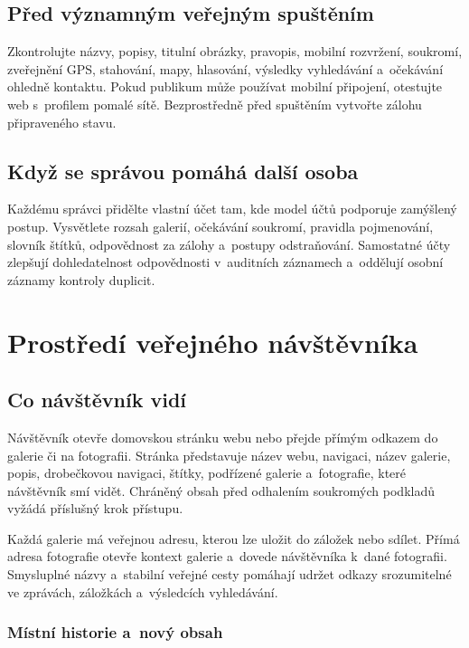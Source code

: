 \documentclass[11pt,a4paper]{article}
\begin{document}
\subsection{Před významným veřejným spuštěním}

Zkontrolujte názvy, popisy, titulní obrázky, pravopis, mobilní rozvržení,
soukromí, zveřejnění GPS, stahování, mapy, hlasování, výsledky vyhledávání
a~očekávání ohledně kontaktu. Pokud publikum může používat mobilní připojení,
otestujte web s~profilem pomalé sítě. Bezprostředně před spuštěním vytvořte
zálohu připraveného stavu.

\subsection{Když se správou pomáhá další osoba}

Každému správci přidělte vlastní účet tam, kde model účtů podporuje zamýšlený
postup. Vysvětlete rozsah galerií, očekávání soukromí, pravidla pojmenování,
slovník štítků, odpovědnost za zálohy a~postupy odstraňování. Samostatné účty
zlepšují dohledatelnost odpovědnosti v~auditních záznamech a~oddělují osobní
záznamy kontroly duplicit.

\section{Prostředí veřejného návštěvníka}
\label{sec:public}

\subsection{Co návštěvník vidí}

Návštěvník otevře domovskou stránku webu nebo přejde přímým odkazem do galerie
či na fotografii. Stránka představuje název webu, navigaci, název galerie,
popis, drobečkovou navigaci, štítky, podřízené galerie a~fotografie, které
návštěvník smí vidět. Chráněný obsah před odhalením soukromých podkladů vyžádá
příslušný krok přístupu.

Každá galerie má veřejnou adresu, kterou lze uložit do záložek nebo sdílet.
Přímá adresa fotografie otevře kontext galerie a~dovede návštěvníka k~dané
fotografii. Smysluplné názvy a~stabilní veřejné cesty pomáhají udržet odkazy
srozumitelné ve zprávách, záložkách a~výsledcích vyhledávání.

\subsubsection{Místní historie a~nový obsah}
\end{document}
